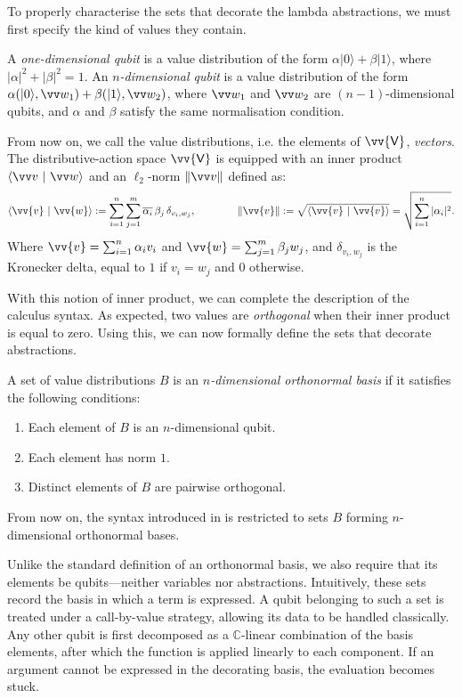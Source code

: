 \documentclass[runningheads,orivec,envcountsame,envcountsect]{llncs}
\newcommand\ket[1]{\ensuremath{|#1\rangle}}
\DeclareRobustCommand{\ValD}{\ensuremath{\vv{\mathsf{V}}}}
\def\C{\mathbb{C}}            %
\def\scal#1#2{\langle{#1}~|~{#2}\rangle}
\def\Pair#1#2{(#1,#2)} %
\begin{document}
To properly characterise the sets that decorate the lambda abstractions, we
must first specify the kind of values they contain.
\begin{definition}[Qubits]
  A \emph{one-dimensional qubit} is a value distribution of the form
  $\alpha\ket{0} + \beta\ket{1}$, where $|\alpha|^2 + |\beta|^2 = 1$. An
  \emph{$n$-dimensional qubit} is a value distribution of the form
  $\alpha\Pair{\ket{0}}{\vv w_1} + \beta\Pair{\ket{1}}{\vv w_2}$, where
  $\vv w_1$ and $\vv w_2$ are $(n-1)$-dimensional qubits, and $\alpha$ and
  $\beta$ satisfy the same normalisation condition.
\end{definition}

From now on, we call the value distributions, i.e. the elements of $\ValD$,
\emph{vectors}. The distributive-action space $\ValD$ is equipped with an inner
product $\scal{\vv v}{\vv w}$ and an $\ell_2$-norm $\|\vv v\|$ defined as:
\[
  \scal{\vv{v}}{\vv{w}} := \sum_{i=1}^n\sum_{j=1}^m
  \overline{\alpha_i}\,\beta_j\,\delta_{v_i,w_j},
  \qquad\qquad
  \|\vv{v}\| := \sqrt{\scal{\vv{v}}{\vv{v}}}
  = \sqrt{\sum_{i=1}^n|\alpha_i|^2}.
\]
Where $\vv{v}=\sum_{i=1}^n\alpha_i v_i$ and
$\vv{w}=\sum_{j=1}^m\beta_j w_j$, and $\delta_{v_i,w_j}$ is the Kronecker
delta, equal to $1$ if $v_i=w_j$ and $0$ otherwise.

With this notion of inner product, we can complete the description of the
calculus syntax. As expected, two values are \emph{orthogonal} when their inner
product is equal to zero. Using this, we can now formally define the sets that
decorate abstractions.
\begin{definition}[Basis]\label{def:NthDimensionalBasis}
  A set of value distributions $B$ is an \emph{$n$-dimensional orthonormal
  basis} if it satisfies the following conditions:
  \begin{enumerate}
    \item Each element of $B$ is an $n$-dimensional qubit.
    \item Each element has norm $1$.
    \item Distinct elements of $B$ are pairwise orthogonal.
  \end{enumerate}
\end{definition}

From now on, the syntax introduced in 
is restricted to sets $B$ forming $n$-dimensional
orthonormal bases.


Unlike the standard definition of an orthonormal basis, we also require that
its elements be qubits—neither variables nor abstractions. Intuitively, these
sets record the basis in which a term is expressed. A qubit belonging to such a
set is treated under a call-by-value strategy, allowing its data to be handled
classically. Any other qubit is first decomposed as a $\C$-linear combination
of the basis elements, after which the function is applied linearly to each
component. If an argument cannot be expressed in the decorating basis, the
evaluation becomes stuck.
\end{document}
